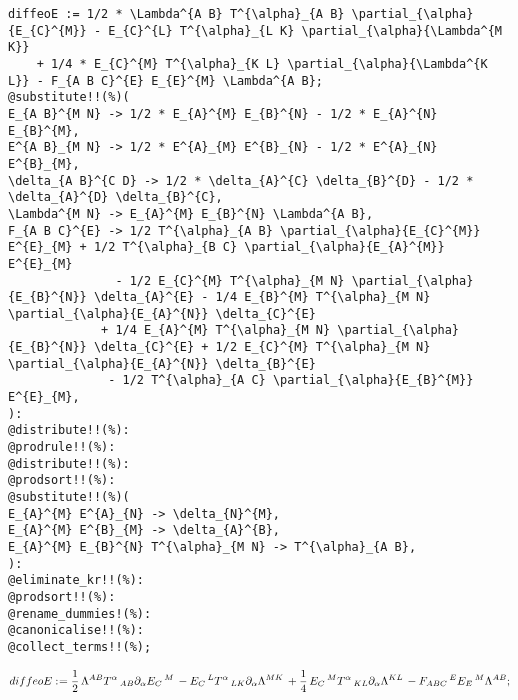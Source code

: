 \documentclass[11pt]{article}
\def\specialcolon{\mathrel{\mathop{:}}\hspace{-.5em}}
\begin{document}
{\color[named]{Blue}\begin{verbatim}
diffeoE := 1/2 * \Lambda^{A B} T^{\alpha}_{A B} \partial_{\alpha}{E_{C}^{M}} - E_{C}^{L} T^{\alpha}_{L K} \partial_{\alpha}{\Lambda^{M K}}
    + 1/4 * E_{C}^{M} T^{\alpha}_{K L} \partial_{\alpha}{\Lambda^{K L}} - F_{A B C}^{E} E_{E}^{M} \Lambda^{A B};
@substitute!!(%)(
E_{A B}^{M N} -> 1/2 * E_{A}^{M} E_{B}^{N} - 1/2 * E_{A}^{N} E_{B}^{M},
E^{A B}_{M N} -> 1/2 * E^{A}_{M} E^{B}_{N} - 1/2 * E^{A}_{N} E^{B}_{M},
\delta_{A B}^{C D} -> 1/2 * \delta_{A}^{C} \delta_{B}^{D} - 1/2 * \delta_{A}^{D} \delta_{B}^{C},
\Lambda^{M N} -> E_{A}^{M} E_{B}^{N} \Lambda^{A B},
F_{A B C}^{E} -> 1/2 T^{\alpha}_{A B} \partial_{\alpha}{E_{C}^{M}} E^{E}_{M} + 1/2 T^{\alpha}_{B C} \partial_{\alpha}{E_{A}^{M}} E^{E}_{M}
               - 1/2 E_{C}^{M} T^{\alpha}_{M N} \partial_{\alpha}{E_{B}^{N}} \delta_{A}^{E} - 1/4 E_{B}^{M} T^{\alpha}_{M N} \partial_{\alpha}{E_{A}^{N}} \delta_{C}^{E}
             + 1/4 E_{A}^{M} T^{\alpha}_{M N} \partial_{\alpha}{E_{B}^{N}} \delta_{C}^{E} + 1/2 E_{C}^{M} T^{\alpha}_{M N} \partial_{\alpha}{E_{A}^{N}} \delta_{B}^{E}
              - 1/2 T^{\alpha}_{A C} \partial_{\alpha}{E_{B}^{M}} E^{E}_{M},
):
@distribute!!(%):
@prodrule!!(%):
@distribute!!(%):
@prodsort!!(%):
@substitute!!(%)(
E_{A}^{M} E^{A}_{N} -> \delta_{N}^{M},
E_{A}^{M} E^{B}_{M} -> \delta_{A}^{B},
E_{A}^{M} E_{B}^{N} T^{\alpha}_{M N} -> T^{\alpha}_{A B},
):
@eliminate_kr!!(%):
@prodsort!!(%):
@rename_dummies!(%):
@canonicalise!!(%):
@collect_terms!!(%);
\end{verbatim}}

\begin{dmath*}[compact, spread=2pt]
diffeoE\specialcolon{}= \frac{1}{2}\, {\Lambda}^{A B} {T}^{\alpha}\,_{A B} {\partial}_{\alpha}{{E}_{C}\,^{M}}\,  - {E}_{C}\,^{L} {T}^{\alpha}\,_{L K} {\partial}_{\alpha}{{\Lambda}^{M K}}\,  + \frac{1}{4}\, {E}_{C}\,^{M} {T}^{\alpha}\,_{K L} {\partial}_{\alpha}{{\Lambda}^{K L}}\,  - {F}_{A B C}\,^{E} {E}_{E}\,^{M} {\Lambda}^{A B};
\end{dmath*}
\end{document}
